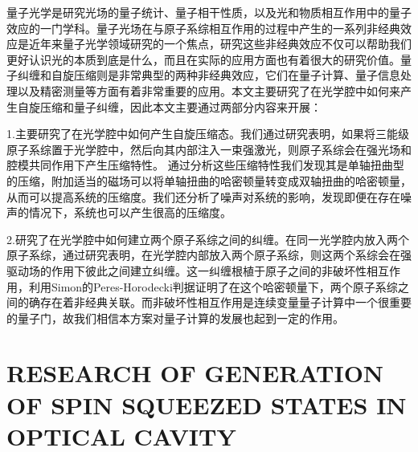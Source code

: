 {
	\par
	\linespread{1.5}\selectfont
	
	
	量子光学是研究光场的量子统计、量子相干性质，以及光和物质相互作用中的量子效应的一门学科。量子光场在与原子系综相互作用的过程中产生的一系列非经典效应是近年来量子光学领域研究的一个焦点，研究这些非经典效应不仅可以帮助我们更好认识光的本质到底是什么，而且在实际的应用方面也有着很大的研究价值。量子纠缠和自旋压缩则是非常典型的两种非经典效应，它们在量子计算、量子信息处理以及精密测量等方面有着非常重要的应用。本文主要研究了在光学腔中如何来产生自旋压缩和量子纠缠，因此本文主要通过两部分内容来开展：%
	
	1.主要研究了在光学腔中如何产生自旋压缩态。我们通过研究表明，如果将三能级原子系综置于光学腔中，然后向其内部注入一束强激光，则原子系综会在强光场和腔模共同作用下产生压缩特性。
	通过分析这些压缩特性我们发现其是单轴扭曲型的压缩，附加适当的磁场可以将单轴扭曲的哈密顿量转变成双轴扭曲的哈密顿量，从而可以提高系统的压缩度。我们还分析了噪声对系统的影响，发现即便在存在噪声的情况下，系统也可以产生很高的压缩度。
	
	
	2.研究了在光学腔中如何建立两个原子系综之间的纠缠。在同一光学腔内放入两个原子系综，通过研究表明，在光学腔内部放入两个原子系综，则这两个系综会在强驱动场的作用下彼此之间建立纠缠。这一纠缠根植于原子之间的非破坏性相互作用，利用Simon的Peres-Horodecki判据证明了在这个哈密顿量下，两个原子系综之间的确存在着非经典关联。而非破坏性相互作用是连续变量量子计算中一个很重要的量子门，故我们相信本方案对量子计算的发展也起到一定的作用。
\par

\vbox{}
}

\chapter[Abstract]{\linespread{1.5}\selectfont RESEARCH OF GENERATION OF SPIN SQUEEZED STATES IN OPTICAL CAVITY}

